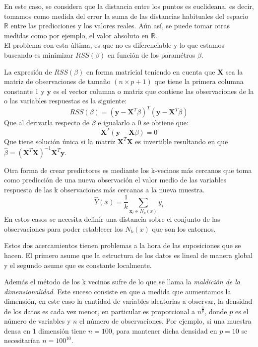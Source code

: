 \noindent En este caso, se considera que la distancia entre los puntos es euclideana, es decir, tomamos como medida del error la suma de las distancias habituales del espacio $\mathbb{R}$ entre las predicciones y los valores reales. Aún así, se puede tomar otras medidas como por ejemplo, el valor absoluto en $\mathbb{R}$.\\
El problema con esta última, es que no es diferenciable y lo que estamos buscando es minimizar $RSS(\beta)$ en función de los paramétros $\beta$.

\noindent La expresión de $RSS(\beta)$ en forma matricial teniendo en cuenta que $\textbf{X}$ sea la matriz de observaciones de tamaño $(n\times p+1)$ que tiene la primera columna constante 1 y $\textbf{y}$ es el vector columna o matriz que contiene las observaciones de la o las variables respuestas  es la siguiente: 
\begin{equation}
RSS(\beta)=(\textbf{y}-\textbf{X}^T\beta)^T(\textbf{y}-\textbf{X}^T\beta)
\end{equation}
Que al derivarla respecto de $\beta$ e igualarlo a $0$ se obtiene que:
\begin{equation}
\textbf{X}^T(\textbf{y}-\textbf{X}\beta)=0
\end{equation}
Que tiene solución única si la matriz $\textbf{X}^T\textbf{X}$ es invertible resultando en que $\hat{\beta}=(\textbf{X}^T\textbf{X})^{-1}\textbf{X}^T\textbf{y}$.

\noindent Otra forma de crear predictores es mediante los k-vecinos más cercanos que toma como predicción de una nueva observación el valor medio de las variables respuesta de las k observaciones más cercanas a la nueva muestra. 
\begin{equation}
\hat{Y}(x)=\dfrac{1}{k}\sum_{\textbf{x}_i\in N_k(x)}y_i
\end{equation}
\noindent En estos casos se necesita definir una distancia sobre el conjunto de las observaciones para poder establecer los $N_k(x)$ que son los entornos. 

\noindent Estos dos acercamientos tienen problemas a la hora de las suposiciones que se hacen. El primero asume que la estructura de los datos es lineal de manera global y el segundo asume que es constante localmente. 

\noindent Además el método de los k vecinos sufre de lo que se llama la \textit{maldición de la dimensionalidad}. Este suceso consiste en que a medida que aumentamos la dimensión, en este caso la cantidad de variables aleatorias a observar, la densidad de los datos es cada vez menor, en particular es proporcional a $n^{\frac{1}{p}}$, donde $p$ es el número de variables y $n$ el número de observaciones. Por ejemplo, si una muestra densa en $1$ dimensión tiene $n=100$, para mantener dicha densidad en $p=10$ se necesitarían $n = 100^{10}$. 

